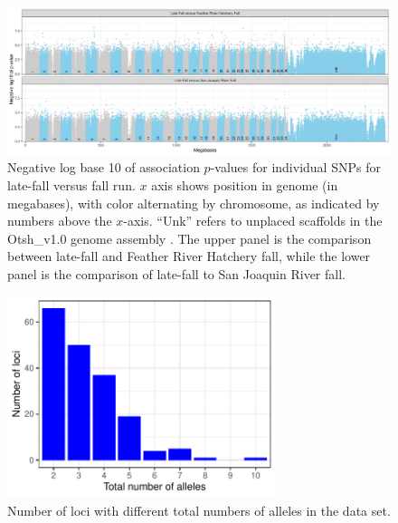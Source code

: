 
\begin{figure}
\includegraphics[width=\textwidth]{images/lfar-assoc-faceted.jpg}
\caption[
	Negative log base 10 of association $p$-values for
	individual SNPs for late-fall versus fall run
]{
	\footnotesize Negative log base 10 of association $p$-values for
	individual SNPs for late-fall versus fall run.  $x$ axis shows position in genome (in megabases),
	with color alternating by chromosome, as indicated by numbers above the $x$-axis. ``Unk'' refers
	to unplaced scaffolds in the Otsh\_v1.0 genome assembly \citep{christensen2018chinook}. The 
	upper panel is the comparison between late-fall and Feather River Hatchery fall, while the lower 
	panel is the comparison of late-fall to San Joaquin River fall. 
}
\label{fig:lfar-assoc}
\end{figure}



\begin{figure}
\begin{center}
\includegraphics[width=0.7\textwidth]{images/num-alle-barplot.pdf}
\end{center}
\caption[Number of loci with different
total numbers of alleles]{\footnotesize Number of loci with different
total numbers of alleles in the data set.}
\label{fig:num-alle}
\end{figure}




